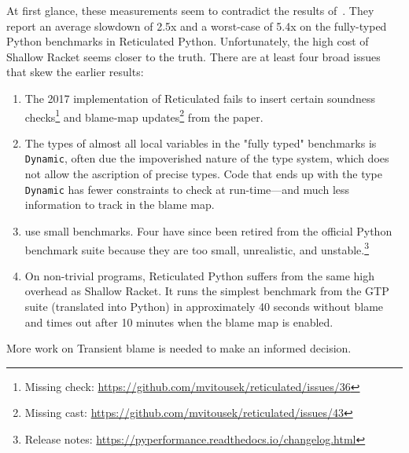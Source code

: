 At first glance, these measurements seem to contradict the results
of~\citet{vss-popl-2017}. They report an average slowdown of 2.5x and a
worst-case of 5.4x on the fully-typed Python benchmarks in Reticulated Python.
Unfortunately, the high cost of Shallow Racket seems closer to the truth.
There are at least four broad issues that skew the earlier results:
\begin{enumerate}

\item The 2017 implementation of Reticulated fails to insert certain soundness
checks\footnote{Missing check:
\url{https://github.com/mvitousek/reticulated/issues/36}} and blame-map
updates\footnote{Missing cast:
\url{https://github.com/mvitousek/reticulated/issues/43}} from the paper.

\item The types of almost all local variables in the "fully typed" benchmarks is
{\tt Dynamic}, often due the impoverished nature of the type system, which does
not allow the ascription of precise types.  Code that ends up with the type {\tt
Dynamic} has fewer constraints to check at run-time---and much less information
to track in the blame map.

\item \citet{vss-popl-2017} use small benchmarks.  Four have since been retired
from the official Python benchmark suite because they are too small,
unrealistic, and unstable.\footnote{Release notes:
\url{https://pyperformance.readthedocs.io/changelog.html}}

\item On non-trivial programs, Reticulated Python suffers from the same high
overhead as Shallow Racket.  It runs the simplest benchmark from the GTP suite (translated into Python)
in approximately 40 seconds without blame and times out after 10 minutes when
the blame map is enabled.

\end{enumerate}
More work on Transient blame is needed to make an informed decision. 


